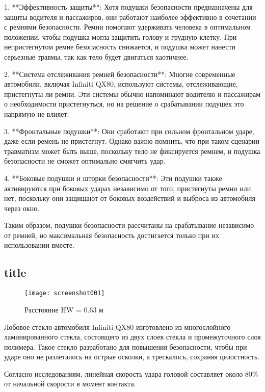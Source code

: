    1. **Эффективность защиты**: Хотя подушки безопасности предназначены для защиты водителя и пассажиров, они работают наиболее эффективно в сочетании с ремнями безопасности. Ремни помогают удерживать человека в оптимальном положении, чтобы подушка могла защитить голову и грудную клетку. При непристегнутом ремне безопасность снижается, и подушка может нанести серьезные травмы, так как тело будет двигаться хаотичнее.
   
   2. **Система отслеживания ремней безопасности**: Многие современные автомобили, включая Infiniti QX80, используют системы, отслеживающие, пристегнуты ли ремни. Эти системы обычно напоминают водителю и пассажирам о необходимости пристегнуться, но на решение о срабатывании подушек это напрямую не влияет.
   
   3. **Фронтальные подушки**: Они сработают при сильном фронтальном ударе, даже если ремень не пристегнут. Однако важно помнить, что при таком сценарии травматизм может быть выше, поскольку тело не фиксируется ремнем, и подушка безопасности не сможет оптимально смягчить удар.
   
   4. **Боковые подушки и шторки безопасности**: Эти подушки также активируются при боковых ударах независимо от того, пристегнуты ремни или нет, поскольку они защищают от боковых воздействий и выброса из автомобиля через окно.
   
   Таким образом, подушки безопасности рассчитаны на срабатывание независимо от ремней, но максимальная безопасность достигается только при их использовании вместе.
   
   
   \subsection{title}
   
   
   \begin{figure}[!]
   	\centering
   	\texttt{[image: screenshot001]}
   	\caption{Расстояние HW = 0.63 м}
   	\label{fig:screenshot001}
   \end{figure}
   
   
   
Лобовое стекло автомобиля Infiniti QX80 изготовлено из многослойного ламинированного стекла, состоящего из двух слоев стекла и промежуточного слоя полимера. Такое стекло разработано для повышения безопасности, чтобы при ударе оно не разлеталось на острые осколки, а трескалось, сохраняя целостность.

Согласно исследованиям, линейная скорость удара головой составляет около 80\% от начальной скорости в момент контакта.

